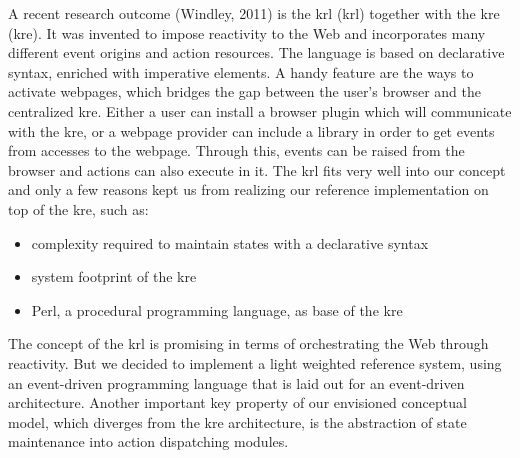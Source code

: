 A recent research outcome (Windley, 2011) is the \textrm{\acrlong{krl} (\acrshort{krl})}\cite{bookTheLiveWeb} together with the \textrm{\acrlong{kre} (\acrshort{kre})}.
It was invented to impose reactivity to the Web and incorporates many different event origins and action resources.
The language is based on declarative syntax, enriched with imperative elements.
A handy feature are the ways to activate webpages, which bridges the gap between the user's browser and the centralized \textrm{\acrshort{kre}}.
Either a user can install a browser plugin which will communicate with the \textrm{\acrshort{kre}}, or a webpage provider can include a library in order to get events from accesses to the webpage.
Through this, events can be raised from the browser and actions can also execute in it.
The \textrm{\acrshort{krl}} fits very well into our concept and only a few reasons kept us from realizing our reference implementation on top of the \textrm{\acrshort{kre}}, such as:
\begin{itemize}
  \item complexity required to maintain states with a declarative syntax 
  \item system footprint of the \textrm{\acrshort{kre}}
  \item \textrm{Perl}, a procedural programming language, as base of the \textrm{\acrshort{kre}}
\end{itemize}
The concept of the \textrm{\acrshort{krl}} is promising in terms of orchestrating the Web through reactivity.
But we decided to implement a light weighted reference system, using an event-driven programming language that is laid out for an event-driven architecture.
Another important key property of our envisioned conceptual model, which diverges from the \textrm{\acrshort{kre}} architecture, is the abstraction of state maintenance into action dispatching modules.

